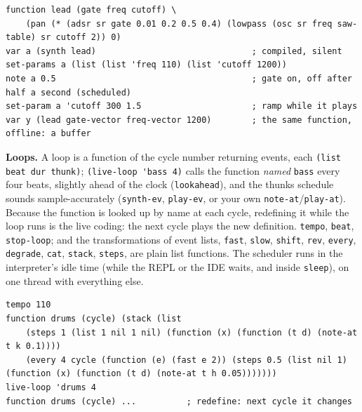 \documentclass[11pt,a4paper]{article}
\newcommand{\musil}[1]{\lstinline[style=musilinline]{#1}}
\begin{document}
\begin{lstlisting}
function lead (gate freq cutoff) \
    (pan (* (adsr sr gate 0.01 0.2 0.5 0.4) (lowpass (osc sr freq saw-table) sr cutoff 2)) 0)
var a (synth lead)                               ; compiled, silent
set-params a (list (list 'freq 110) (list 'cutoff 1200))
note a 0.5                                       ; gate on, off after half a second (scheduled)
set-param a 'cutoff 300 1.5                      ; ramp while it plays
var y (lead gate-vector freq-vector 1200)        ; the same function, offline: a buffer
\end{lstlisting}

\textbf{Loops.} A loop is a function of the cycle number returning events, each
\musil{(list beat dur thunk)}; \musil{(live-loop 'bass 4)} calls the function \emph{named}
\musil{bass} every four beats, slightly ahead of the clock (\musil{lookahead}), and the
thunks schedule sounds sample-accurately (\musil{synth-ev}, \musil{play-ev}, or your own
\musil{note-at}/\musil{play-at}). Because the function is looked up by name at each cycle,
redefining it while the loop runs is the live coding: the next cycle plays the new
definition. \musil{tempo}, \musil{beat}, \musil{stop-loop}; and the transformations of
event lists, \musil{fast}, \musil{slow}, \musil{shift}, \musil{rev}, \musil{every},
\musil{degrade}, \musil{cat}, \musil{stack}, \musil{steps}, are plain list functions.
The scheduler runs in the interpreter's idle time (while the REPL or the IDE waits,
and inside \musil{sleep}), on one thread with everything else.

\begin{lstlisting}
tempo 110
function drums (cycle) (stack (list
    (steps 1 (list 1 nil 1 nil) (function (x) (function (t d) (note-at t k 0.1))))
    (every 4 cycle (function (e) (fast e 2)) (steps 0.5 (list nil 1) (function (x) (function (t d) (note-at t h 0.05)))))))
live-loop 'drums 4
function drums (cycle) ...          ; redefine: next cycle it changes
\end{lstlisting}
\end{document}
